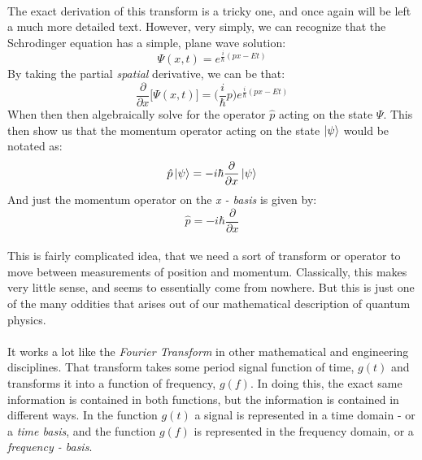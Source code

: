 \documentclass[12pt,letterpaper]{book}
\begin{document}
\paragraph*{}The exact derivation of this transform is a tricky one, and once again will be left a much more detailed text. However, very simply, we can recognize that the Schrodinger equation has a simple, plane wave solution:
\begin{equation}
\label{plane wave sol}
\Psi(x,t) = e^{\frac{i}{\hbar}(px - Et)}
\end{equation} 
By taking the partial \textit{spatial} derivative, we can be that:
\begin{equation}
\frac{\partial}{\partial x}\Big[ \Psi(x,t) \Big] = \big( \frac{i}{\hbar}p\big) e^{\frac{i}{\hbar}(px - Et)}
\end{equation}
When then then algebraically solve for the operator $\hat{p}$ acting on the state $\Psi$. This then show us that the momentum operator acting on the state $\ket{\psi}$ would be notated as:
\begin{equation}
\label{momentum on psi}
\hat{p}\ket{\psi} = -i\hbar\frac{\partial}{\partial x}\ket{\psi}
\end{equation}
And just the momentum operator on the \textit{x - basis} is given by:
\begin{equation}
\label{momentum}
\hat{p} = -i\hbar\frac{\partial}{\partial x}
\end{equation}
\paragraph*{}This is fairly complicated idea, that we need a sort of transform or operator to move between measurements of position and momentum. Classically, this makes very little sense, and seems to essentially come from nowhere. But this is just one of the many oddities that arises out of our mathematical description of quantum physics. 
\paragraph*{}It works a lot like the \textit{Fourier Transform} in other mathematical and engineering disciplines. That transform takes some period signal function of time, $g(t)$ and transforms it into a function of frequency, $g(f)$. In doing this, the exact same information is contained in both functions, but the information is contained in different ways. In the function $g(t)$ a signal is represented in a time domain - or a \textit{time basis}, and the function $g(f)$ is represented in the frequency domain, or a \textit{frequency - basis}.
\end{document}
